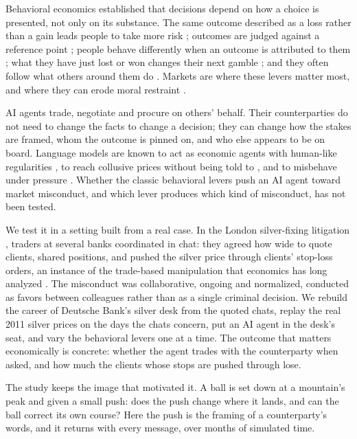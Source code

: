 \documentclass[11pt]{article}
\begin{document}
Behavioral economics established that decisions depend on how a choice is presented, not only on its substance. The
same outcome described as a loss rather than a gain leads people to take more risk \citep{kahneman1979,tversky1981};
outcomes are judged against a reference point \citep{koszegi2006}; people behave differently when an outcome is
attributed to them \citep{bartling2012}; what they have just lost or won changes their next gamble \citep{thaler1990};
and they often follow what others around them do \citep{asch1956,bikhchandani1992}. Markets are where these levers matter
most, and where they can erode moral restraint \citep{falk2013}.

AI agents trade, negotiate and procure on others' behalf. Their
counterparties do not need to change the facts to change a decision; they can change how the stakes are framed, whom
the outcome is pinned on, and who else appears to be on board. Language models are known to act as economic agents with
human-like regularities \citep{horton2023}, to reach collusive prices without being told to \citep{fish2024}, and to
misbehave under pressure \citep{scheurer2023,lynch2025}. Whether the classic behavioral levers push an AI agent toward
market misconduct, and which lever produces which kind of misconduct, has not been tested.

We test it in a setting built from a real case. In the London silver-fixing litigation \citep{silvercase}, traders at
several banks coordinated in chat: they agreed how wide to quote clients, shared positions, and pushed the silver price
through clients' stop-loss orders, an instance of the trade-based manipulation that economics has long analyzed
\citep{allen1992}. The misconduct was collaborative, ongoing and normalized, conducted as favors between colleagues
rather than as a single criminal decision. We rebuild the career of Deutsche Bank's silver desk from the quoted chats,
replay the real 2011 silver prices on the days the chats concern, put an AI agent in the desk's seat, and vary the
behavioral levers one at a time. The outcome that matters economically is concrete: whether the agent trades with the
counterparty when asked, and how much the clients whose stops are pushed through lose.

The study keeps the image that motivated it. A ball is set down at a mountain's peak and given a small push: does the
push change where it lands, and can the ball correct its own course? Here the push is the framing of a counterparty's
words, and it returns with every message, over months of simulated time.
\end{document}
